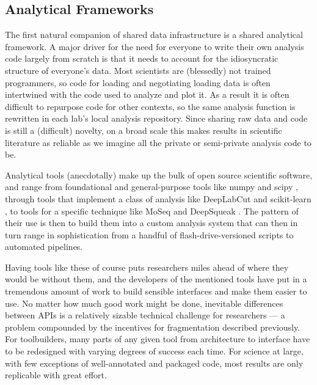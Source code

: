\documentclass[10pt]{tufte-book}
\begin{document}
\subsection{Analytical Frameworks}

The first natural companion of shared data infrastructure is a shared
analytical framework. A major driver for the need for everyone to write
their own analysis code largely from scratch is that it needs to account
for the idiosyncratic structure of everyone's data. Most scientists are
(blessedly) not trained programmers, so code for loading and negotiating
loading data is often intertwined with the code used to analyze and plot
it. As a result it is often difficult to repurpose code for other
contexts, so the same analysis function is rewritten in each lab's local
analysis repository. Since sharing raw data and code is still a
(difficult) novelty, on a broad scale this makes results in scientific
literature as reliable as we imagine all the private or semi-private
analysis code to be.

Analytical tools (anecdotally) make up the bulk of open source
scientific software, and range from foundational and general-purpose
tools like numpy \citep{harrisArrayProgrammingNumPy2020}  and
scipy \citep{virtanenSciPyFundamentalAlgorithms2020} , through
tools that implement a class of analysis like DeepLabCut \citep{mathisDeepLabCutMarkerlessPose2018a}  and scikit-learn \citep{pedregosaScikitlearnMachineLearning2011} , to tools for a specific
technique like MoSeq \citep{wiltschkoRevealingStructurePharmacobehavioral2020}  and DeepSqueak
\citep{coffeyDeepSqueakDeepLearningbased2019} . The pattern of
their use is then to build them into a custom analysis system that can
then in turn range in sophistication from a handful of
flash-drive-versioned scripts to automated pipelines.

Having tools like these of course puts researchers miles ahead of where
they would be without them, and the developers of the mentioned tools
have put in a tremendous amount of work to build sensible interfaces and
make them easier to use. No matter how much good work might be done,
inevitable differences between APIs is a relatively sizable technical
challenge for researchers --- a problem compounded by the incentives for
fragmentation described previously. For toolbuilders, many parts of any
given tool from architecture to interface have to be redesigned with
varying degrees of success each time. For science at large, with few
exceptions of well-annotated and packaged code, most results are only
replicable with great effort.
\end{document}
